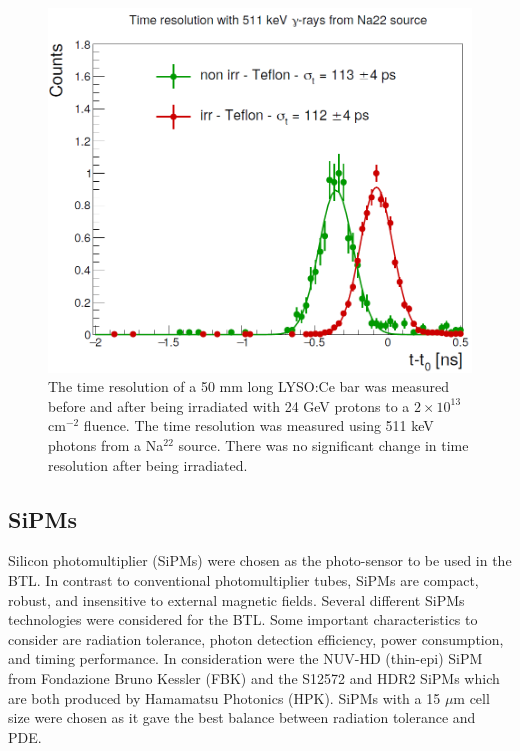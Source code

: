 \begin{figure}[h]
	\centering
	\includegraphics[width=1.0\linewidth]{Figures/lysoradhardtimeres}
	\caption[Time resolution measurements of LYSO:Ce before and after irradiation.]{The time resolution of a 50 mm long LYSO:Ce bar was measured before and after being irradiated with 24 GeV protons to a $2 \times 10^{13}$ cm$^{-2}$ fluence. The time resolution was measured using 511 keV photons from a Na$^{22}$ source. There was no significant change in time resolution after being irradiated.}
	\label{fig:lysoradhardtimeres}
\end{figure}

\subsection{SiPMs}
Silicon photomultiplier (SiPMs) were chosen as the photo-sensor to be used in the BTL.  In contrast to conventional photomultiplier tubes, SiPMs are compact, robust, and insensitive to external magnetic fields.  Several different SiPMs technologies were considered for the BTL.  Some important characteristics to consider are radiation tolerance, photon detection efficiency, power consumption, and timing performance.  In consideration were the NUV-HD (thin-epi) SiPM from Fondazione Bruno Kessler (FBK) and the S12572 and HDR2 SiPMs which are both produced by Hamamatsu Photonics (HPK).  SiPMs with a 15 $\mu$m cell size were chosen as it gave the best balance between radiation tolerance and PDE.

